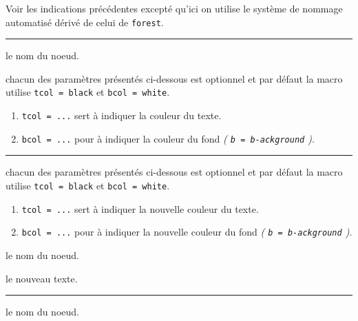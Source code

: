 \documentclass[12pt,a4paper]{article}
\theoremstyle{definition}
\newcommand\separation{
    \medskip
    \hfill\rule{0.5\textwidth}{0.75pt}\hfill
    \medskip
}
\newcommand\extraspace{
    \vspace{0.25em}
}
\newcommand\mwhyprefix[2]{%
    \texttt{#1 = #1-#2}%
}
\begin{document}
\bigskip




\extraspace
\extraspace

Voir les indications précédentes excepté qu'ici on utilise le système de nommage automatisé dérivé de celui de \verb#forest#.





\separation



 le nom du noeud.

 chacun des paramètres présentés ci-dessous est optionnel et par défaut la macro utilise \verb#tcol = black# et \verb#bcol = white#.

\begin{enumerate}
	\item \verb#tcol = ...# sert à indiquer la couleur du texte.

	\item \verb#bcol = ...# pour à indiquer la couleur du fond \emph{(\mwhyprefix{b}{ackground})}.
\end{enumerate}



%
%
%
%




\separation



\IDoption{} chacun des paramètres présentés ci-dessous est optionnel et par défaut la macro utilise \verb#tcol = black# et \verb#bcol = white#.

\begin{enumerate}
	\item \verb#tcol = ...# sert à indiquer la nouvelle couleur du texte.

	\item \verb#bcol = ...# pour à indiquer la nouvelle couleur du fond \emph{(\mwhyprefix{b}{ackground})}.
\end{enumerate}

 le nom du noeud.

 le nouveau texte.

%
%
%
%
%




\separation



\IDarg{} le nom du noeud.


%
%
%
%
\end{document}
